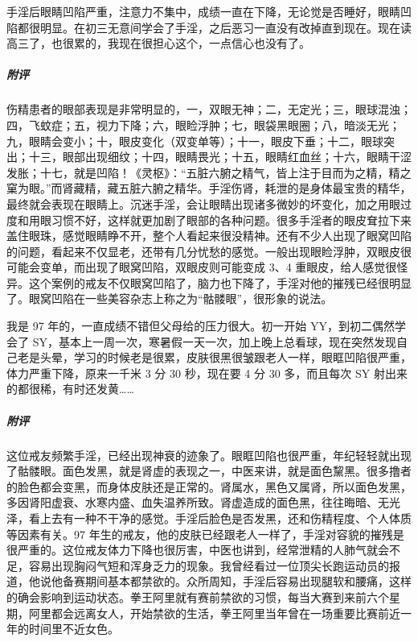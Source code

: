 \begin{case}[面部凹陷]
    手淫后眼睛凹陷严重，注意力不集中，成绩一直在下降，无论觉是否睡好，眼睛凹陷都很明显。在初三无意间学会了手淫，之后恶习一直没有改掉直到现在。现在读高三了，也很累的，我现在很担心这个，一点信心也没有了。
    \subparagraph{附评} 伤精患者的眼部表现是非常明显的，一，双眼无神；二，无定光；三，眼球混浊；四，飞蚊症；五，视力下降；六，眼睑浮肿；七，眼袋黑眼圈；八，暗淡无光；九，眼睛会变小；十，眼皮变化（双变单等）；十一，眼皮下垂；十二，眼球突出；十三，眼部出现细纹；十四，眼睛畏光；十五，眼睛红血丝；十六，眼睛干涩发胀；十七，就是凹陷！《灵枢》：“五脏六腑之精气，皆上注于目而为之精，精之窠为眼。”而肾藏精，藏五脏六腑之精华。手淫伤肾，耗泄的是身体最宝贵的精华，最终就会表现在眼睛上。沉迷手淫，会让眼睛出现诸多微妙的坏变化，加之用眼过度和用眼习惯不好，这样就更加剧了眼部的各种问题。很多手淫者的眼皮耷拉下来盖住眼珠，感觉眼睛睁不开，整个人看起来很没精神。还有不少人出现了眼窝凹陷的问题，看起来不仅显老，还带有几分忧愁的感觉。一般出现眼睑浮肿，双眼皮很可能会变单，而出现了眼窝凹陷，双眼皮则可能变成 3、4 重眼皮，给人感觉很怪异。这个案例的戒友不仅眼窝凹陷了，脑力也下降了，手淫对他的摧残已经很明显了。眼窝凹陷在一些美容杂志上称之为“骷髅眼”，很形象的说法。
\end{case}

\begin{case}[面部凹陷]
    我是 97 年的，一直成绩不错但父母给的压力很大。初一开始 YY，到初二偶然学会了 SY，基本上一周一次，寒暑假一天一次，加上晚上总看球，现在突然发现自己老是头晕，学习的时候老是很累，皮肤很黑很皱跟老人一样，眼眶凹陷很严重，体力严重下降，原来一千米 3 分 30 秒，现在要 4 分 30 多，而且每次 SY 射出来的都很稀，有时还发黄……
    \subparagraph{附评} 这位戒友频繁手淫，已经出现神衰的迹象了。眼眶凹陷也很严重，年纪轻轻就出现了骷髅眼。面色发黑，就是肾虚的表现之一，中医来讲，就是面色黧黑。很多撸者的脸色都会变黑，而身体皮肤还是正常的。肾属水，黑色又属肾，所以面色发黑，多因肾阳虚衰、水寒内盛、血失温养所致。肾虚造成的面色黑，往往晦暗、无光泽，看上去有一种不干净的感觉。手淫后脸色是否发黑，还和伤精程度、个人体质等因素有关。97 年生的戒友，他的皮肤已经跟老人一样了，手淫对容貌的摧残是很严重的。这位戒友体力下降也很厉害，中医也讲到，经常泄精的人肺气就会不足，容易出现胸闷气短和浑身乏力的现象。我曾经看过一位顶尖长跑运动员的报道，他说他备赛期间基本都禁欲的。众所周知，手淫后容易出现腿软和腰痛，这样的确会影响到运动状态。拳王阿里就有赛前禁欲的习惯，每当大赛到来前六个星期，阿里都会远离女人，开始禁欲的生活，拳王阿里当年曾在一场重要比赛前近一年的时间里不近女色。
\end{case}

